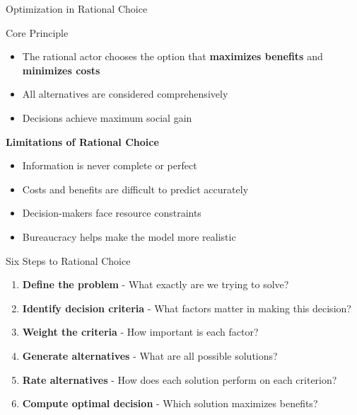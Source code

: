 \documentclass[10pt]{beamer}
\begin{document}
\begin{frame}{Optimization in Rational Choice}
\begin{block}{Core Principle}
\begin{itemize}
\item The rational actor chooses the option that \textcolor{titanorange}{\textbf{maximizes benefits}} and \textcolor{titanorange}{\textbf{minimizes costs}}
\item All alternatives are considered comprehensively
\item Decisions achieve maximum social gain
\end{itemize}
\end{block}

\vspace{0.5cm}
\textbf{Limitations of Rational Choice}
\begin{itemize}
\item Information is never complete or perfect
\item Costs and benefits are difficult to predict accurately
\item Decision-makers face resource constraints
\item Bureaucracy helps make the model more realistic
\end{itemize}
\end{frame}

\begin{frame}{Six Steps to Rational Choice}
\begin{enumerate}
\item \textcolor{titanorange}{\textbf{Define the problem}} - What exactly are we trying to solve?
\vspace{0.3cm}
\item \textcolor{titanorange}{\textbf{Identify decision criteria}} - What factors matter in making this decision?
\vspace{0.3cm}
\item \textcolor{titanorange}{\textbf{Weight the criteria}} - How important is each factor?
\vspace{0.3cm}
\item \textcolor{titanorange}{\textbf{Generate alternatives}} - What are all possible solutions?
\vspace{0.3cm}
\item \textcolor{titanorange}{\textbf{Rate alternatives}} - How does each solution perform on each criterion?
\vspace{0.3cm}
\item \textcolor{titanorange}{\textbf{Compute optimal decision}} - Which solution maximizes benefits?
\end{enumerate}
\end{frame}
\end{document}
